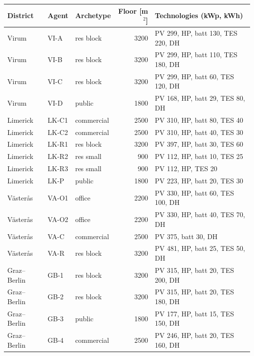 \begin{tabularx}{\textwidth}{@{}lll r X@{}}
\toprule
District & Agent & Archetype & Floor [m$^2$] & Technologies (kWp, kWh) \\
\midrule
Virum & VI-A & res block & 3200 & PV 299, HP, batt 130, TES 220, DH \\
Virum & VI-B & res block & 3200 & PV 299, HP, batt 110, TES 180, DH \\
Virum & VI-C & res block & 3200 & PV 299, HP, batt 60, TES 120, DH \\
Virum & VI-D & public & 1800 & PV 168, HP, batt 29, TES 80, DH \\
Limerick & LK-C1 & commercial & 2500 & PV 310, HP, batt 80, TES 40 \\
Limerick & LK-C2 & commercial & 2500 & PV 310, HP, batt 40, TES 30 \\
Limerick & LK-R1 & res block & 3200 & PV 397, HP, batt 30, TES 60 \\
Limerick & LK-R2 & res small & 900 & PV 112, HP, batt 10, TES 25 \\
Limerick & LK-R3 & res small & 900 & PV 112, HP, TES 20 \\
Limerick & LK-P & public & 1800 & PV 223, HP, batt 20, TES 30 \\
V\"aster\aa s & VA-O1 & office & 2200 & PV 330, HP, batt 60, TES 100, DH \\
V\"aster\aa s & VA-O2 & office & 2200 & PV 330, HP, batt 40, TES 70, DH \\
V\"aster\aa s & VA-C & commercial & 2500 & PV 375, batt 30, DH \\
V\"aster\aa s & VA-R & res block & 3200 & PV 481, HP, batt 25, TES 50, DH \\
Graz--Berlin & GB-1 & res block & 3200 & PV 315, HP, batt 20, TES 200, DH \\
Graz--Berlin & GB-2 & res block & 3200 & PV 315, HP, batt 20, TES 180, DH \\
Graz--Berlin & GB-3 & public & 1800 & PV 177, HP, batt 15, TES 150, DH \\
Graz--Berlin & GB-4 & commercial & 2500 & PV 246, HP, batt 20, TES 160, DH \\
\bottomrule
\end{tabularx}
